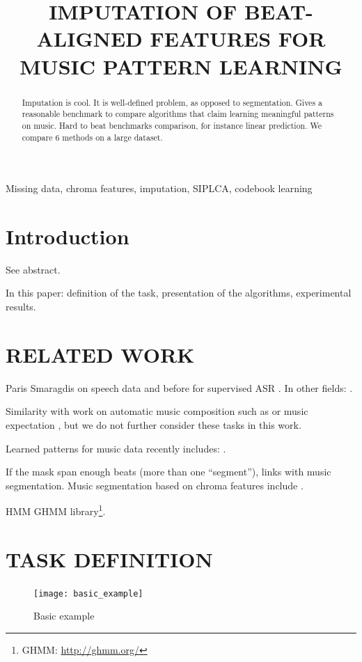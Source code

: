 \documentclass{article}
\title{IMPUTATION OF BEAT-ALIGNED FEATURES FOR MUSIC PATTERN LEARNING}
\begin{document}
%
\maketitle
%
\begin{abstract}
Imputation is cool. It is well-defined problem, as opposed to segmentation.
Gives a reasonable benchmark to compare algorithms that claim learning meaningful
patterns on music. Hard to beat benchmarks comparison, for instance linear
prediction. We compare 6 methods on a large dataset.
\end{abstract}
%
\begin{keywords}
Missing data, chroma features, imputation, SIPLCA, codebook learning
\end{keywords}
%
\section{Introduction}
\label{sec:intro}

See abstract.

In this paper: definition of the task, presentation of the algorithms, experimental
results.

\section{RELATED WORK}
\label{sec:relatedwork}

Paris Smaragdis on speech data \cite{Smaragdis2009} and
before for supervised ASR \cite{Morris1998}.
In other fields: \cite{Oba2003}.

Similarity with work on automatic music composition such as \cite{Todd1989,Mozer1994a,Eck2002d} or music
expectation \cite{Hazan2010}, but we do not further consider these tasks in this work.

Learned patterns for music data recently includes: \cite{Bertin-Mahieux2010a,Casey2007,Weiss2010}.

If the mask span enough beats (more than one ``segment''), links with music segmentation.
Music segmentation based on chroma features include \cite{Weiss2010,Levy2008,Mauch2009}.

HMM \cite{Rabiner1989} GHMM library\footnote{GHMM: \url{http://ghmm.org/}}.

\section{TASK DEFINITION}
\label{sec:task}

\begin{figure}[t]
\begin{center}
\texttt{[image: basic\_example]}
\end{center}
\caption{Basic example}
\label{fig:code}
\end{figure}
\end{document}
